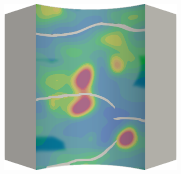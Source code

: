 \begin{frame}
\begin{columns}[T]
\begin{column}{0.6\textwidth}
\begin{figure}
{\begin{subfigure}{0.19\textwidth}
          \end{subfigure}
          \hspace{0.06\textwidth}
          \begin{subfigure}{0.19\textwidth}
            \centering
            \includegraphics[width=\textwidth]{examples/figures/ep.0033}
          \end{subfigure}
        }
        

\end{figure}
\end{column}
\end{columns}
\end{frame}
